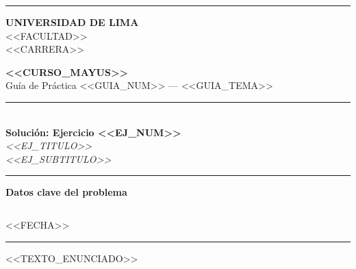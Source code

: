 \documentclass[12pt,a4paper]{article}
\begin{document}
\begin{titlepage}
\centering
\vspace*{1cm}

{\color{azulul}\rule{\linewidth}{1.5pt}}
\vspace{0.5cm}

{\large\textbf{UNIVERSIDAD DE LIMA}\\[0.2cm]
<<FACULTAD>>\\
<<CARRERA>>}

\vspace{1.5cm}

{\LARGE\color{azulul}\textbf{<<CURSO_MAYUS>>}}\\[0.4cm]
{\Large Gu\'ia de Pr\'actica <<GUIA_NUM>> --- <<GUIA_TEMA>>}

\vspace{1.5cm}

{\color{azulul}\rule{0.6\linewidth}{0.8pt}}\\[0.5cm]
{\LARGE\textbf{Soluci\'on: Ejercicio <<EJ_NUM>>}}\\[0.3cm]
{\Large\textit{<<EJ_TITULO>>}}\\[0.3cm]
{\Large\textit{<<EJ_SUBTITULO>>}}\\[0.5cm]
{\color{azulul}\rule{0.6\linewidth}{0.8pt}}

\vspace{2cm}

\begin{tcolorbox}[colback=azulclaro!30, colframe=azulul, width=0.75\linewidth, halign=center]
\centering
\textbf{Datos clave del problema}\\[0.4cm]
\begin{tabular}{ll}
\end{tabular}
\end{tcolorbox}

\vfill
{\large <<FECHA>>}

{\color{azulul}\rule{\linewidth}{1.5pt}}
\end{titlepage}

\begin{cajaenunciado}
<<TEXTO_ENUNCIADO>>
\end{cajaenunciado}
\end{document}

